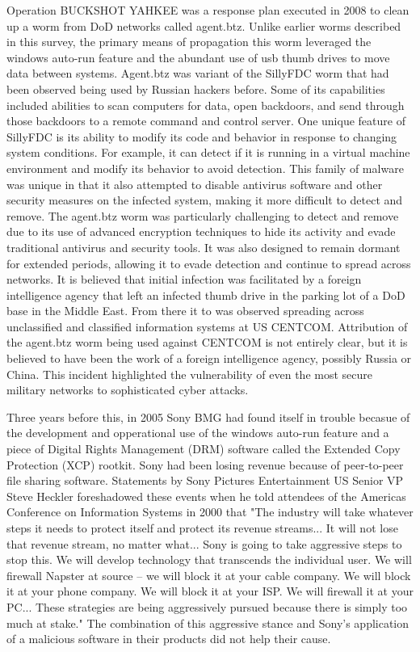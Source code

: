 \documentclass[12pt]{report}
\begin{document}
Operation BUCKSHOT YAHKEE was a response plan executed in 2008 to clean up a worm from DoD networks called agent.btz.  Unlike earlier worms described in this survey, the primary means of propagation this worm leveraged the windows auto-run feature and the abundant use of usb thumb drives to move data between systems.  Agent.btz was variant of the SillyFDC worm that had been observed being used by Russian hackers before.  Some of its capabilities included abilities to scan computers for data, open backdoors, and send through those backdoors to a remote command and control server.  One unique feature of SillyFDC is its ability to modify its code and behavior in response to changing system conditions. For example, it can detect if it is running in a virtual machine environment and modify its behavior to avoid detection.  This family of malware was unique in that it also attempted to disable antivirus software and other security measures on the infected system, making it more difficult to detect and remove.  The agent.btz worm was particularly challenging to detect and remove due to its use of advanced encryption techniques to hide its activity and evade traditional antivirus and security tools. It was also designed to remain dormant for extended periods, allowing it to evade detection and continue to spread across networks.  It is believed that initial infection was facilitated by a foreign intelligence agency that left an infected thumb drive in the parking lot of a DoD base in the Middle East.  From there it to was observed spreading across unclassified and classified information systems at US CENTCOM.  Attribution of the agent.btz worm being used against CENTCOM is not entirely clear, but it is believed to have been the work of a foreign intelligence agency, possibly Russia or China.  This incident highlighted the vulnerability of even the most secure military networks to sophisticated cyber attacks.

Three years before this, in 2005 Sony BMG had found itself in trouble becasue of the development and opperational use of the windows auto-run feature and a piece of Digital Rights Management (DRM) software called the Extended Copy Protection (XCP) rootkit.  Sony had been losing revenue because of peer-to-peer file sharing software.  Statements by Sony Pictures Entertainment US Senior VP Steve Heckler foreshadowed these events when he told attendees of the Americas Conference on Information Systems in 2000 that "The industry will take whatever steps it needs to protect itself and protect its revenue streams... It will not lose that revenue stream, no matter what... Sony is going to take aggressive steps to stop this. We will develop technology that transcends the individual user. We will firewall Napster at source – we will block it at your cable company. We will block it at your phone company. We will block it at your ISP. We will firewall it at your PC... These strategies are being aggressively pursued because there is simply too much at stake."  The combination of this aggressive stance and Sony’s application of a malicious software in their products did not help their cause. 
\end{document}
